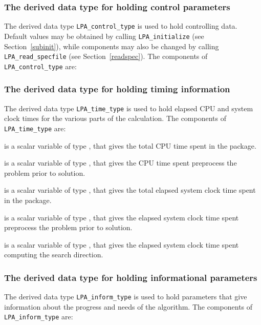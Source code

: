 \documentclass{galahad}
\newcommand{\packagename}{LPA}
\begin{document}

\subsubsection{The derived data type for holding control
 parameters}\label{typecontrol}
The derived data type
{\tt \packagename\_control\_type}
is used to hold controlling data. Default values may be obtained by calling
{\tt \packagename\_initialize}
(see Section~\ref{subinit}),
while components may also be changed by calling
{\tt \packagename\_read\-\_specfile}
(see Section~\ref{readspec}).
The components of
{\tt \packagename\_control\_type}
are:




\subsubsection{The derived data type for holding timing
 information}\label{typetime}
The derived data type
{\tt \packagename\_time\_type}
is used to hold elapsed CPU and system clock times for the various parts of
the calculation. The components of
{\tt \packagename\_time\_type}
are:
\begin{description}
 is a scalar variable of type \realdp, that gives
 the total CPU time spent in the package.

 is a scalar variable of type \realdp, that gives
 the CPU time spent preprocess the problem prior to solution.

 is a scalar variable of type \realdp, that gives
 the total elapsed system clock time spent in the package.

 is a scalar variable of type \realdp, that gives
 the elapsed system clock time spent preprocess the problem prior to solution.

 is a scalar variable of type \realdp, that gives
 the elapsed system clock time spent computing the search direction.

\end{description}


\subsubsection{The derived data type for holding informational
 parameters}\label{typeinform}
The derived data type
{\tt \packagename\_inform\_type}
is used to hold parameters that give information about the progress and needs
of the algorithm. The components of
{\tt \packagename\_inform\_type}
are:
\end{document}
